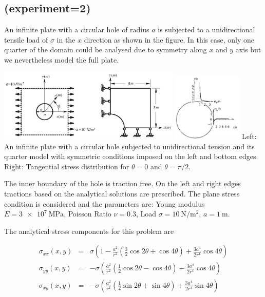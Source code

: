 \newpage
\subsection*{\textcite{rama16} (experiment=2)}

An infinite plate with a circular hole of radius $a$  
is subjected to a unidirectional tensile load of $\sigma$ in the $x$ direction as shown
in the figure. In this case, only one quarter of the domain could be analysed due
to symmetry along $x$ and $y$ axis but we nevertheless model the full plate.

\begin{center}
\includegraphics[width=0.65\textwidth]{python_codes/fieldstone_124/images/yobu02}
\includegraphics[width=0.25\textwidth]{python_codes/fieldstone_124/images/yobu02b}
{\captionfont Left: An infinite plate with a circular hole subjected to unidirectional tension 
and its quarter model with symmetric conditions imposed on the left and bottom edges.
Right: Tangential stress distribution for $\theta=0$  and $\theta=\pi/2$. \cite{yobu02}}
\end{center}


The inner boundary of the hole is traction free. 
On the left and right edges tractions based on the analytical solutions are prescribed.
The {\color{red}plane stress} condition is considered and the parameters are: 
Young modulus $E=\SI{3e7}{\mega\pascal}$, Poisson Ratio $\nu=0.3$, 
Load $\sigma=10~\si{\newton\per\square\meter}$, $a=1~\si{\meter}$.

The analytical stress components for this problem are  

\begin{eqnarray}
\sigma_{xx}(x,y) &=& \sigma \left(  1-\frac{a^2}{r^2}\left(\frac{3}{2}\cos 2\theta + \cos 4\theta \right) 
+ \frac{3a^4}{2r^4} \cos 4\theta \right) \\
\sigma_{yy}(x,y) &=& -\sigma \left( \frac{a^2}{r^2} \left(\frac{1}{2}\cos 2\theta - \cos 4\theta \right) 
- \frac{3a^4}{2r^4} \cos 4\theta \right) \\
\sigma_{xy}(x,y) &=& -\sigma \left( \frac{a^2}{r^2} \left(\frac{1}{2}\sin 2\theta + \sin 4\theta\right) 
+ \frac{3a^4}{2r^4} \sin 4\theta \right) 
\end{eqnarray}

